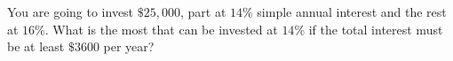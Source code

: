You are going to invest $\$25{,}000$, part at $14\%$ simple annual interest and the rest at $16\%$. What is the most that can be invested at $14\%$ if the total interest must be at least $\$3600$ per year?
